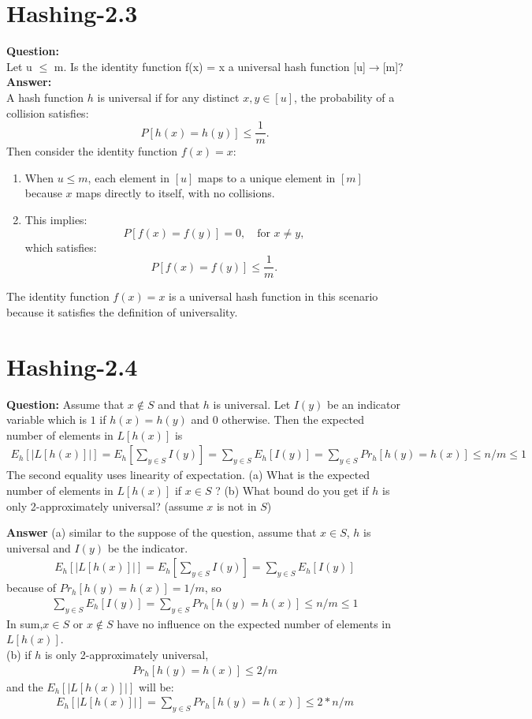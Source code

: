 \documentclass[12pt]{article}
\begin{document}
\section{Hashing-2.3}
\textbf{Question:}\\
Let u $\leq$ m. Is the identity function f(x) = x a universal hash function [u]$\rightarrow$[m]?\\
\textbf{Answer:}\\
A hash function \( h \) is universal if for any distinct \( x, y \in [u] \), the probability of a collision satisfies:
\[
P[h(x) = h(y)] \leq \frac{1}{m}.
\]
Then consider the identity function \( f(x) = x \):
\begin{enumerate}
    \item When \( u \leq m \), each element in \( [u] \) maps to a unique element in \( [m] \) because \( x \) maps directly to itself, with no collisions.
    \item This implies:
    \[
    P[f(x) = f(y)] = 0, \quad \text{for } x \neq y,
    \]
    which satisfies:
    \[
    P[f(x) = f(y)] \leq \frac{1}{m}.
    \]
\end{enumerate}
The identity function \( f(x) = x \) is a universal hash function in this scenario because it satisfies the definition of universality.

\section{Hashing-2.4}
\textbf{Question:} 
Assume that $x \notin S$ and that $h$ is universal. Let $I(y)$ be an indicator variable which is $1$ if $h(x) = h(y)$ and $0$ otherwise. Then the expected number of elements in $L[h(x)]$ is
\begin{align}
    E_h[|L[h(x)]|] = E_h [\sum_{y\in S} I(y)]  = \sum_{y \in S} E_h[I(y)] = \sum_{y \in S} Pr_h[h(y) = h(x)] \leq n/m \leq 1
\end{align}
 The second equality uses linearity of expectation.
(a) What is the expected number of elements in $L[h(x)]$ if $x \in S$ ?
(b) What bound do you get if $h$ is only 2-approximately universal? (assume $x$ is not in $S$)

\textbf{Answer}
(a) similar to the suppose of the question, assume that $x \in S$, $h$ is universal and $I(y)$ be the indicator.
\begin{align}
    E_h[|L[h(x)]|] = E_h [\sum_{y\in S} I(y)]  = \sum_{y \in S} E_h[I(y)]
\end{align}
because of $Pr_h[h(y) = h(x)] = 1/m$, so
\begin{align}
    \sum_{y \in S} E_h[I(y)] = \sum_{y \in S} Pr_h[h(y) = h(x)] \leq n/m \leq 1
\end{align}
In sum,$ x \in S$ or $x \notin S $ have no influence on the expected number of elements in $L[h(x)]$.\\
(b) if $h$ is only 2-approximately universal, 
\begin{align}
Pr_h[h(y) = h(x)] \leq 2/m
\end{align}
and the $E_h[|L[h(x)]|] $ will be:
\begin{align}
    E_h[|L[h(x)]|] = \sum_{y \in S} Pr_h[h(y) = h(x)] \leq 2 * n / m
\end{align}
\end{document}
